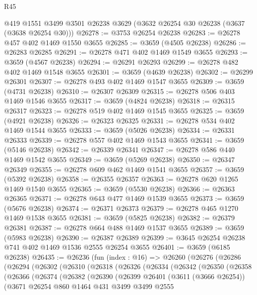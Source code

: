\begin{lexlean}{R45}
\begin{coremodule}
    @419
    @1551
    @3499
    @3501
    @26238
    @3629
    (@3632 @26254 @30 @26238 (@3637 (@3638 @26254 @30)))
@26278 := @3753 @26254 @26238
@26283 := @26278 @457 @402 @1469 @1550 @3655
@26285 := @3659 (@4505 @26238)
@26286 := @26283 @26285
@26291 := @26278 @471 @402 @1469 @1549 @3655
@26293 := @3659 (@4567 @26238)
@26294 := @26291 @26293
@26299 := @26278 @482 @402 @1469 @1548 @3655
@26301 := @3659 (@4639 @26238)
@26302 := @26299 @26301
@26307 := @26278 @493 @402 @1469 @1547 @3655
@26309 := @3659 (@4731 @26238)
@26310 := @26307 @26309
@26315 := @26278 @506 @403 @1469 @1546 @3655
@26317 := @3659 (@4824 @26238)
@26318 := @26315 @26317
@26323 := @26278 @519 @402 @1469 @1545 @3655
@26325 := @3659 (@4921 @26238)
@26326 := @26323 @26325
@26331 := @26278 @534 @402 @1469 @1544 @3655
@26333 := @3659 (@5026 @26238)
@26334 := @26331 @26333
@26339 := @26278 @557 @402 @1469 @1543 @3655
@26341 := @3659 (@5146 @26238)
@26342 := @26339 @26341
@26347 := @26278 @586 @440 @1469 @1542 @3655
@26349 := @3659 (@5269 @26238)
@26350 := @26347 @26349
@26355 := @26278 @609 @462 @1469 @1541 @3655
@26357 := @3659 (@5392 @26238)
@26358 := @26355 @26357
@26363 := @26278 @620 @1265 @1469 @1540 @3655
@26365 := @3659 (@5530 @26238)
@26366 := @26363 @26365
@26371 := @26278 @643 @477 @1469 @1539 @3655
@26373 := @3659 (@5676 @26238)
@26374 := @26371 @26373
@26379 := @26278 @465 @1270 @1469 @1538 @3655
@26381 := @3659 (@5825 @26238)
@26382 := @26379 @26381
@26387 := @26278 @664 @488 @1469 @1537 @3655
@26389 := @3659 (@5983 @26238)
@26390 := @26387 @26389
@26399 := @3645 @26254 @26238 @741 @402 @1469 @1536 @2555 @26254 @3655
@26401 := @3659 (@6185 @26238)
@26435 := @26236
    (fun (index : @16) =>
    @26260
      (@26276
        (@26286
          (@26294
            (@26302
              (@26310
                (@26318
                  (@26326
                    (@26334
                      (@26342
                        (@26350
                          (@26358
                            (@26366
                              (@26374
                                (@26382
                                  (@26390
                                    (@26399
                                      @26401
                                      (@3611 (@3666 @26254))
                                      (@3671
                                        @26254
                                        @860
                                        @1464
                                        @431
                                        @3499
                                        @3499
                                        @2555

\end{coremodule}
\end{lexlean}
